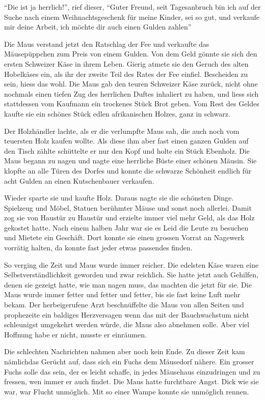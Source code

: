 \enquote{Die ist ja herrlich!}, rief dieser, \enquote{Guter Freund, seit Tagesanbruch bin ich auf der Suche nach einem Weihnachtsgeschenk für meine Kinder, sei so gut, und verkaufe mir deine Arbeit, ich möchte dir auch einen Gulden zahlen}

Die Maus verstand jetzt den Ratschlag der Fee und verkaufte das Mäusepüppchen zum Preis von einem Gulden. Von dem Geld gönnte sie sich den ersten Schweizer Käse in ihrem Leben. Gierig atmete sie den Geruch des alten Hobelkäses ein, als ihr der zweite Teil des Rates der Fee einfiel. Bescheiden zu sein, hiess das wohl. Die Maus gab den teuren Schweizer Käse zurück, nicht ohne nochmals einen tiefen Zug des herrlichen Duftes inhaliert zu haben, und liess sich stattdessen vom Kaufmann ein trockenes Stück Brot geben. Vom Rest des Geldes kaufte sie ein schönes Stück edlen afrikanischen Holzes, ganz in schwarz. 

Der Holzhändler lachte, als er die verlumpfte Maus sah, die auch noch vom teuersten Holz kaufen wollte. Als diese ihm aber fast einen ganzen Gulden auf den Tisch zählte schüttelte er nur den Kopf und holte ein Stück Ebenholz. Die Maus begann zu nagen und nagte eine herrliche Büste einer schönen Mäusin. Sie klopfte an alle Türen des Dorfes und konnte die schwarze Schönheit endlich für acht Gulden an einen Kutschenbauer verkaufen.

Wieder sparte sie und kaufte Holz. Daraus nagte sie die schönsten Dinge. Spielzeug und Möbel, Statuen berühmter Mäuse und sonst noch allerlei. Damit zog sie von Haustür zu Haustür und erzielte immer viel mehr Geld, als das Holz gekostet hatte. Nach einem halben Jahr war sie es Leid die Leute zu besuchen und Mietete ein Geschäft. Dort konnte sie einen grossen Vorrat an Nagewerk vorrätig halten, da konnte fast jeder etwas passendes finden.

So verging die Zeit und Maus wurde immer reicher. Die edelsten Käse waren eine Selbstverständlichkeit geworden und zwar reichlich. Sie hatte jetzt auch Gehilfen, denen sie gezeigt hatte, wie man nagen muss, das machten die jetzt für sie. Die Maus wurde immer fetter und fetter und fetter, bis sie fast keine Luft mehr bekam. Der herbeigerufene Arzt beschnüffelte die Maus von allen Seiten und prophezeite ein baldiges Herzversagen wenn das mit der Bauchwachstum nicht schleunigst umgekehrt werden würde, die Maus also abnehmen solle. Aber viel Hoffnung habe er nicht, musste er einräumen.

Die schlechten Nachrichten nahmen aber noch kein Ende. Zu dieser Zeit kam nämlichdas Gerücht auf, dass sich ein Fuchs dem Mäusedorf nähere. Ein grosser Fuchs solle das sein, der es leicht schaffe, in jedes Mäusehaus einzudringen und zu fressen, wen immer er auch findet. Die Maus hatte furchtbare Angst. Dick wie sie war, war Flucht unmöglich. Mit so einer Wampe konnte sie unmöglich rennen.


